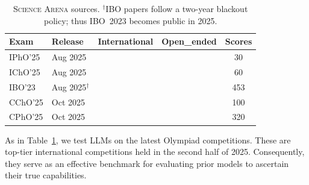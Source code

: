 \documentclass[11pt]{article}
\newcommand{\cmark}{\ding{51}}
\newcommand{\xmark}{\ding{55}}
\begin{document}
\begin{table}[t]
\centering
\footnotesize
\setlength{\tabcolsep}{4pt}
\renewcommand{\arraystretch}{1.08}
\begin{tabular}{l l c c c}
\toprule
\textbf{Exam} & \textbf{Release} & \textbf{International} & \textbf{Open\_ended} & \textbf{Scores} \\
\midrule
IPhO'25 & Aug 2025 & \cmark & \cmark & 30 \\
IChO'25 & Aug 2025 & \cmark & \cmark & 60 \\
IBO'23  & Aug 2025$^\dagger$ & \cmark & \xmark & 453 \\
CChO'25 & Oct 2025 & \xmark & \cmark & 100 \\
CPhO'25 & Oct 2025 & \xmark & \cmark & 320 \\
\bottomrule
\end{tabular}
\vspace{-0.3em}
\caption{\textsc{Science Arena} sources. $^\dagger$IBO papers follow a two-year blackout policy; thus IBO~2023 becomes public in 2025. }
\vspace{-0.8em}
\label{tab:science_arena_sources}
\end{table}
As in Table~\ref{tab:science_arena_sources}, we test LLMs on the latest Olympiad competitions. These are top-tier international competitions held in the second half of 2025. Consequently, they serve as an effective benchmark for evaluating prior models to ascertain their true capabilities.

\end{document}
